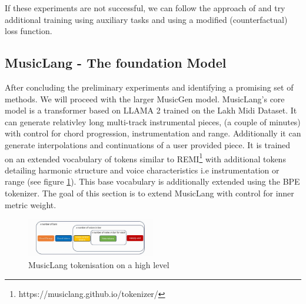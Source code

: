 If these experiments are not successful, we can follow the approach of \cite{Shu_Xu_Musebarcontrol_2024} and try additional training using auxiliary tasks and using a modified (counterfactual) loss function. 


\subsection{MusicLang - The foundation Model}
After concluding the preliminary experiments and identifying a promising set of methods. We will proceed with the larger MusicGen model. 
MusicLang's core model is a transformer based on LLAMA 2 trained on the Lakh Midi Dataset\cite{Raffel_2016}. It can generate relativley long multi-track instrumental pieces, (a couple of minutes) with control for chord progression, instrumentation and range. Additionally it can generate interpolations and continuations of a user provided piece. It is trained on an extended vocabulary of tokens similar to REMI\footnote{https://musiclang.github.io/tokenizer/} with additional tokens detailing harmonic structure and voice characteristics i.e instrumentation or range (see figure \ref{fig:musiclangtok}). This base vocabulary is additionally extended using the BPE tokenizer. The goal of this section is to extend MusicLang with control for inner metric weight.  

\begin{figure}[H]
    \centering
    \includegraphics[width=0.5\textwidth]{IMAGES/MusicLang.JPG} 
    \caption{MusicLang tokenisation on a high level}
    \label{fig:musiclangtok}
\end{figure}

